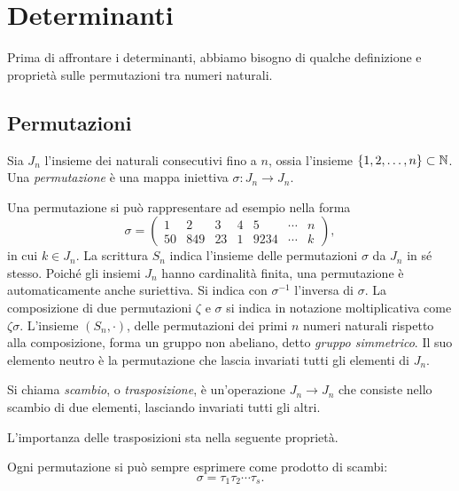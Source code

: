 \chapter{Determinanti}
Prima di affrontare i determinanti, abbiamo bisogno di qualche definizione e proprietà sulle permutazioni tra numeri naturali.
\section{Permutazioni} \label{sec:permutazioni}
\begin{definizione} \label{d:permutazione}
	Sia $J_n$ l'insieme dei naturali consecutivi fino a $n$, ossia l'insieme $\{1,2,\dots,n\}\subset\mathbb{N}$.
	Una \emph{permutazione} è una mappa iniettiva $\sigma\colon J_n\to J_n$.
\end{definizione}
Una permutazione si può rappresentare ad esempio nella forma
\begin{equation*}
\sigma=\begin{pmatrix}1&2&3&4&5&\cdots&n\\50&849&23&1&9234&\cdots&k\end{pmatrix},
\end{equation*}
in cui $k\in J_n$.
La scrittura $S_n$ indica l'insieme delle permutazioni $\sigma$ da $J_n$ in sé stesso.
Poiché gli insiemi $J_n$ hanno cardinalità finita, una permutazione è automaticamente anche suriettiva.
Si indica con $\sigma^{-1}$ l'inversa di $\sigma$.
La composizione di due permutazioni $\zeta$ e $\sigma$ si indica in notazione moltiplicativa come $\zeta\sigma$.
L'insieme $(S_n,\cdot)$, delle permutazioni dei primi $n$ numeri naturali rispetto alla composizione, forma un gruppo non abeliano, detto \emph{gruppo simmetrico}.
Il suo elemento neutro è la permutazione che lascia invariati tutti gli elementi di $J_n$.
\begin{definizione} \label{d:scambio}
	Si chiama \emph{scambio}, o \emph{trasposizione}, è un'operazione $J_n\to J_n$ che consiste nello scambio di due elementi, lasciando invariati tutti gli altri.
\end{definizione}
L'importanza delle trasposizioni sta nella seguente proprietà.
\begin{proprieta} \label{pr:permutazione-prodotto-scambi}
	Ogni permutazione si può sempre esprimere come prodotto di scambi:
	\begin{equation*}
		\sigma=\tau_1\tau_2\cdots\tau_s.
	\end{equation*}
\end{proprieta}

